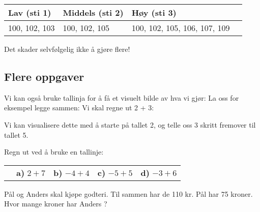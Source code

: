 \documentclass[a4, 11pt, twoside]{article}
\theoremstyle{definition}
\newenvironment{eksempel}
   {\pushQED{\qed}\renewcommand{\qedsymbol}{%
   $\clubsuit$}\eksempelx}
   {\popQED\endeksempelx}
\newcommand{\Z}{\mathbb{Z}}
\begin{document}
\begin{center}
\begin{tabular}{| l | l | l | l |}
\hline
\textbf{Lav (sti 1)}         & \textbf{Middels (sti 2)}       &       \textbf{Høy (sti 3)}      \\ \hline
100, 102, 103           & 100, 102, 105                       & 100, 102, 105, 106, 107, 109    \\ \hline
\end{tabular}
\begin{center}

Det skader selvfølgelig ikke å gjøre flere!

\subsection{Flere oppgaver}

Vi kan også bruke tallinja for å få et visuelt bilde av hva vi gjør:
La oss for eksempel legge sammen:
\begin{eksempel}
Vi skal regne ut 2 + 3:
\begin{center}
\end{center}
Vi kan visualisere dette med å starte på tallet 2, og telle oss 3 skritt fremover til
tallet 5.
\end{eksempel}

\begin{Exercise}
Regn ut ved å bruke en tallinje:
\begin{center}
\begin{tabular}{l l l l l}
& \textbf{a)} $2 + 7$
& \textbf{b)} $-4 + 4$
& \textbf{c)} $-5 + 5$
& \textbf{d)} $-3 + 6$
\end{tabular}
\end{center}
\end{Exercise}

\begin{Exercise}
Pål og Anders skal kjøpe godteri. Til sammen har de 110 kr. 
Pål har 75 kroner. Hvor mange kroner har Anders ?
\end{Exercise}


\end{center}
\end{center}
\end{document}
